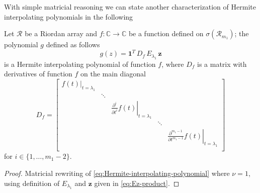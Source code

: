 With simple matricial reasoning we can state another characterization of 
Hermite interpolating polynomials in the following

\begin{corollary}
Let $\mathcal{R}$ be a Riordan array and $f: \mathbb{C}\rightarrow\mathbb{C}$
be a function defined on $\sigma\left(\mathcal{R}_{m_1}\right)$; the polynomial $g$
defined as follows
\begin{displaymath}
g(z) %
     = \boldsymbol{1}^{T}\,D_{f}\, E_{\lambda_{1}} \,\boldsymbol{z}
\end{displaymath}
is a Hermite interpolating polynomial of function $f$,
where $D_{f}$ is a matrix with derivatives of function $f$ on the main diagonal
\begin{displaymath}
D_{f} = 
\left[
    \begin{array}{ccccc}
        \left.f(t)\right|_{t=\lambda_{1}} & \\
                                          &  \ddots \\
                                          &         & \left.\frac{\partial^{i}}{\partial t^{i}}f(t)\right|_{t=\lambda_{1}} \\
                                          &         &                                                                       & \ddots \\
                                          &         &                                                                       &        &  \left.\frac{\partial^{m_{1}-1}}{\partial t^{m_{1}-1}}f(t)\right|_{t=\lambda_{1}} \\
    \end{array}
\right]
\end{displaymath}
for $i\in  \lbrace 1,\ldots,m_{1}-2 \rbrace$.
\end{corollary}

\begin{proof}
Matricial rewriting of \autoref{eq:Hermite-interpolating-polynomial} where
$\nu=1$, using definition of $E_{\lambda_{1}}$ and $\boldsymbol{z}$ given in
\autoref{eq:Ez-product}.
\end{proof}
